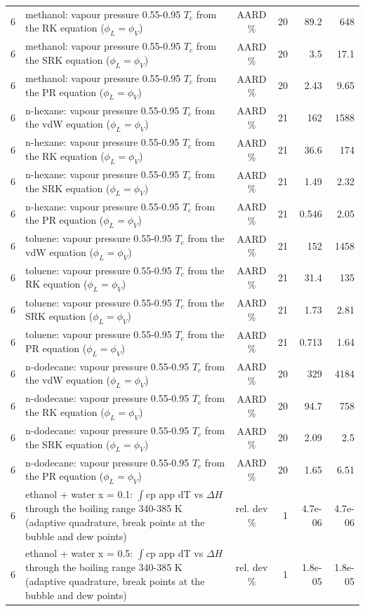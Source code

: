 \begin{tabular}{c p{8.6cm} c r r r}
6 & methanol: vapour pressure 0.55-0.95 $T_c$ from the RK equation ($\phi_L = \phi_V$) & AARD \% & 20 & 89.2 & 648 \\
6 & methanol: vapour pressure 0.55-0.95 $T_c$ from the SRK equation ($\phi_L = \phi_V$) & AARD \% & 20 & 3.5 & 17.1 \\
6 & methanol: vapour pressure 0.55-0.95 $T_c$ from the PR equation ($\phi_L = \phi_V$) & AARD \% & 20 & 2.43 & 9.65 \\
6 & n-hexane: vapour pressure 0.55-0.95 $T_c$ from the vdW equation ($\phi_L = \phi_V$) & AARD \% & 21 & 162 & 1588 \\
6 & n-hexane: vapour pressure 0.55-0.95 $T_c$ from the RK equation ($\phi_L = \phi_V$) & AARD \% & 21 & 36.6 & 174 \\
6 & n-hexane: vapour pressure 0.55-0.95 $T_c$ from the SRK equation ($\phi_L = \phi_V$) & AARD \% & 21 & 1.49 & 2.32 \\
6 & n-hexane: vapour pressure 0.55-0.95 $T_c$ from the PR equation ($\phi_L = \phi_V$) & AARD \% & 21 & 0.546 & 2.05 \\
6 & toluene: vapour pressure 0.55-0.95 $T_c$ from the vdW equation ($\phi_L = \phi_V$) & AARD \% & 21 & 152 & 1458 \\
6 & toluene: vapour pressure 0.55-0.95 $T_c$ from the RK equation ($\phi_L = \phi_V$) & AARD \% & 21 & 31.4 & 135 \\
6 & toluene: vapour pressure 0.55-0.95 $T_c$ from the SRK equation ($\phi_L = \phi_V$) & AARD \% & 21 & 1.73 & 2.81 \\
6 & toluene: vapour pressure 0.55-0.95 $T_c$ from the PR equation ($\phi_L = \phi_V$) & AARD \% & 21 & 0.713 & 1.64 \\
6 & n-dodecane: vapour pressure 0.55-0.95 $T_c$ from the vdW equation ($\phi_L = \phi_V$) & AARD \% & 20 & 329 & 4184 \\
6 & n-dodecane: vapour pressure 0.55-0.95 $T_c$ from the RK equation ($\phi_L = \phi_V$) & AARD \% & 20 & 94.7 & 758 \\
6 & n-dodecane: vapour pressure 0.55-0.95 $T_c$ from the SRK equation ($\phi_L = \phi_V$) & AARD \% & 20 & 2.09 & 2.5 \\
6 & n-dodecane: vapour pressure 0.55-0.95 $T_c$ from the PR equation ($\phi_L = \phi_V$) & AARD \% & 20 & 1.65 & 6.51 \\
6 & ethanol + water x = 0.1: $\int$cp app dT vs $\Delta H$ through the boiling range 340-385 K (adaptive quadrature, break points at the bubble and dew points) & rel. dev \% & 1 & 4.7e-06 & 4.7e-06 \\
6 & ethanol + water x = 0.5: $\int$cp app dT vs $\Delta H$ through the boiling range 340-385 K (adaptive quadrature, break points at the bubble and dew points) & rel. dev \% & 1 & 1.8e-05 & 1.8e-05 \\
\bottomrule
\end{tabular}
